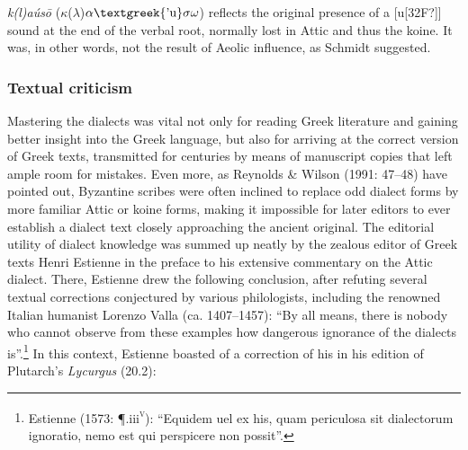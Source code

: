 \begin{styleStandard}
\textit{k(l)aús\=o} ($\kappa $($\lambda $)$\alpha \text{\textgreek{'u}}\sigma \omega $) reflects the original presence of a [u[32F?]] sound at the end of the verbal root, normally lost in Attic and thus the koine. It was, in other words, not the result of Aeolic influence, as Schmidt suggested.
\end{styleStandard}

\subsubsection{Textual criticism}
\hypertarget{Toc19704822}{}\begin{styleStandard}
Mastering the dialects was vital not only for reading Greek literature and gaining better insight into the Greek language, but also for arriving at the correct version of Greek texts, transmitted for centuries by means of manuscript copies that left ample room for mistakes. Even more, as Reynolds \& Wilson (1991: 47–48) have pointed out, Byzantine scribes were often inclined to replace odd dialect forms by more familiar Attic or koine forms, making it impossible for later editors to ever establish a dialect text closely approaching the ancient original. The editorial utility of dialect knowledge was summed up neatly by the zealous editor of Greek texts Henri Estienne in the preface to his extensive commentary on the Attic dialect. There, Estienne drew the following conclusion, after refuting several textual corrections conjectured by various philologists, including the renowned Italian humanist Lorenzo Valla (ca. 1407–1457): “By all means, there is nobody who cannot observe from these examples how dangerous ignorance of the dialects is”.\footnote{ Estienne (1573: ¶.iii\textsc{\textsuperscript{v}}): “Equidem uel ex his, quam periculosa sit dialectorum ignoratio, nemo est qui perspicere non possit”.} In this context, Estienne boasted of a correction of his in his edition of Plutarch’s \textit{Lycurgus} (20.2):
\end{styleStandard}

